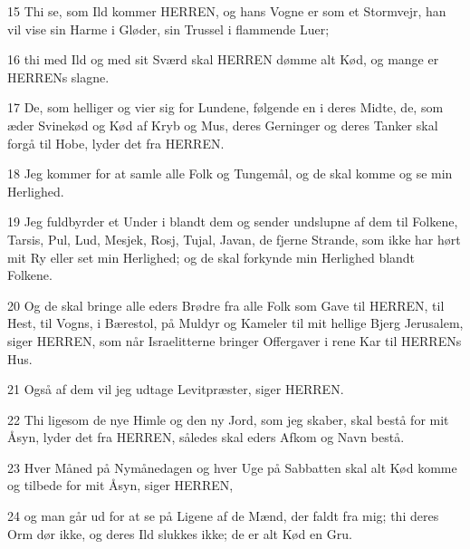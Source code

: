 \par 15 Thi se, som Ild kommer HERREN, og hans Vogne er som et Stormvejr, han vil vise sin Harme i Gløder, sin Trussel i flammende Luer;
\par 16 thi med Ild og med sit Sværd skal HERREN dømme alt Kød, og mange er HERRENs slagne.
\par 17 De, som helliger og vier sig for Lundene, følgende en i deres Midte, de, som æder Svinekød og Kød af Kryb og Mus, deres Gerninger og deres Tanker skal forgå til Hobe, lyder det fra HERREN.
\par 18 Jeg kommer for at samle alle Folk og Tungemål, og de skal komme og se min Herlighed.
\par 19 Jeg fuldbyrder et Under i blandt dem og sender undslupne af dem til Folkene, Tarsis, Pul, Lud, Mesjek, Rosj, Tujal, Javan, de fjerne Strande, som ikke har hørt mit Ry eller set min Herlighed; og de skal forkynde min Herlighed blandt Folkene.
\par 20 Og de skal bringe alle eders Brødre fra alle Folk som Gave til HERREN, til Hest, til Vogns, i Bærestol, på Muldyr og Kameler til mit hellige Bjerg Jerusalem, siger HERREN, som når Israelitterne bringer Offergaver i rene Kar til HERRENs Hus.
\par 21 Også af dem vil jeg udtage Levitpræster, siger HERREN.
\par 22 Thi ligesom de nye Himle og den ny Jord, som jeg skaber, skal bestå for mit Åsyn, lyder det fra HERREN, således skal eders Afkom og Navn bestå.
\par 23 Hver Måned på Nymånedagen og hver Uge på Sabbatten skal alt Kød komme og tilbede for mit Åsyn, siger HERREN,
\par 24 og man går ud for at se på Ligene af de Mænd, der faldt fra mig; thi deres Orm dør ikke, og deres Ild slukkes ikke; de er alt Kød en Gru.


